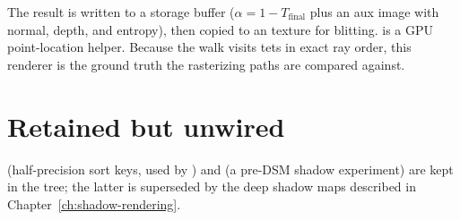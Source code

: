 The result is written to a storage buffer ($\alpha = 1 - T_{\text{final}}$
plus an aux image with normal, depth, and entropy), then copied to an
 texture for blitting.  is a GPU
point-location helper. Because the walk visits tets in exact ray order, this
renderer is the ground truth the rasterizing paths are compared against.

\section{Retained but unwired}

 (half-precision sort keys, used by
) and  (a pre-DSM shadow
experiment) are kept in the tree; the latter is superseded by the deep
shadow maps described in Chapter~\ref{ch:shadow-rendering}.

